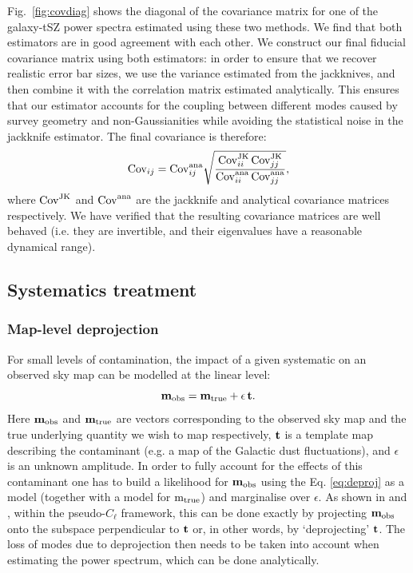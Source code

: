 \documentclass[useAMS,usenatbib]{mn2e}
\begin{document}
    Fig.\!~\ref{fig:covdiag} shows the diagonal of the covariance matrix for one of the galaxy-tSZ power spectra estimated using these two methods. We find that both estimators are in good agreement with each other. We construct our final fiducial covariance matrix using both estimators: in order to ensure that we recover realistic error bar sizes, we use the variance estimated from the jackknives, and then combine it with the correlation matrix estimated analytically. This ensures that our estimator accounts for the coupling between different modes caused by survey geometry and non-Gaussianities while avoiding the statistical noise in the jackknife estimator. The final covariance is therefore:
    \begin{equation}
      {\rm Cov}_{ij} = {\rm Cov}^{\rm ana}_{ij} \sqrt{\frac{{\rm Cov}^{\rm JK}_{ii}\,{\rm Cov}^{\rm JK}_{jj}}{{\rm Cov}^{\rm ana}_{ii}\,{\rm Cov}^{\rm ana}_{jj}}},
    \end{equation}
    where ${\rm Cov}^{\rm JK}$ and ${\rm Cov}^{\rm ana}$ are the jackknife and analytical covariance matrices respectively. We have verified that the resulting covariance matrices are well behaved (i.e. they are invertible, and their eigenvalues have a reasonable dynamical range).

  \subsection{Systematics treatment}\label{ssec:methods.syst}
    \subsubsection{Map-level deprojection}\label{sssec:methods.syst.deproj}
      For small levels of contamination, the impact of a given systematic on an observed sky map can be modelled at the linear level:
      \begin{equation}
        {\bf m}_{\rm obs}={\bf m}_{\rm true} + \epsilon\,{\bf t}.
      \end{equation}\label{eq:deproj}
      Here ${\bf m}_{\rm obs}$ and ${\bf m}_{\rm true}$ are vectors corresponding to the observed sky map and the true underlying quantity we wish to map respectively, ${\bf t}$ is a template map describing the contaminant (e.g. a map of the Galactic dust fluctuations), and $\epsilon$ is an unknown amplitude. In order to fully account for the effects of this contaminant one has to build a likelihood for ${\bf m}_{\rm obs}$ using the Eq. \ref{eq:deproj} as a model (together with a model for ${\rm m}_{\rm true}$) and marginalise over $\epsilon$. As shown in \cite{2017MNRAS.465.1847E} and \cite{2019MNRAS.484.4127A}, within the pseudo-$C_\ell$ framework, this can be done exactly by projecting ${\bf m}_{\rm obs}$ onto the subspace perpendicular to ${\bf t}$ or, in other words, by `deprojecting' ${\bf t}$. The loss of modes due to deprojection then needs to be taken into account when estimating the power spectrum, which can be done analytically.
\end{document}
